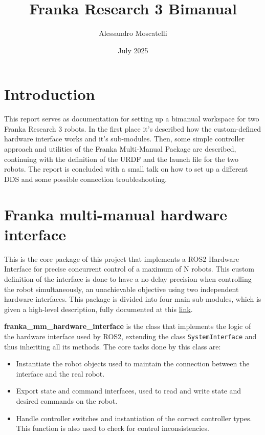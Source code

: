 \documentclass{article}
\title{Franka Research 3 Bimanual}
\author{Alessandro Moscatelli}
\date{July 2025}
\begin{document}
\maketitle

\section{Introduction}

This report serves as documentation for setting up a bimanual workspace for two Franka Research 3 robots. In the first place it's described how the custom-defined hardware interface works and it's sub-modules. Then, some simple controller approach and utilities of the Franka Multi-Manual Package are described, continuing with the definition of the URDF and the launch file for the two robots. The report is concluded with a small talk on how to set up a different DDS and some possible connection troubleshooting.

\section{Franka multi-manual hardware interface}
This is the core package of this project that implements a ROS2 Hardware Interface for precise concurrent control of a maximum of N robots. This custom definition of the interface is done to have a no-delay precision when controlling the robot simultaneously, an unachievable objective using two independent hardware interfaces. This package is divided into four main sub-modules, which is given a high-level description, fully documented at this \href{https://idra-lab.github.io/idra-franka-launch/#doxygen}{link}. 

\textbf{franka\_mm\_hardware\_interface} is the class that implements the logic of the hardware interface used by ROS2, extending the class \texttt{SystemInterface} and thus inheriting all its methods. The core tasks done by this class are: 
\begin{itemize}
    \item Instantiate the robot objects used to maintain the connection between the interface and the real robot.
    \item Export state and command interfaces, used to read and write state and desired commands on the robot.
    \item Handle controller switches and instantiation of the correct controller types. This function is also used to check for control inconsistencies.
\end{itemize}
\end{document}
